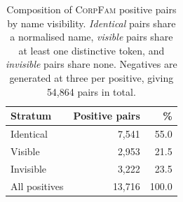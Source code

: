 \begin{table}[t]
\centering
\small
\begin{tabular}{lrr}
\toprule
Stratum & Positive pairs & \% \\
\midrule
Identical & 7,541 & 55.0 \\
Visible & 2,953 & 21.5 \\
Invisible & 3,222 & 23.5 \\
\midrule
All positives & 13,716 & 100.0 \\
\bottomrule
\end{tabular}
\caption{Composition of \textsc{CorpFam} positive pairs by name visibility.
\emph{Identical} pairs share a normalised name, \emph{visible} pairs share at
least one distinctive token, and \emph{invisible} pairs share none. Negatives are
generated at three per positive, giving 54,864 pairs in total.}
\label{tab:composition}
\end{table}
